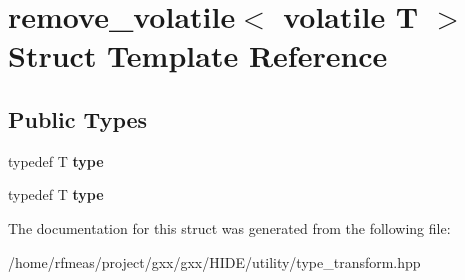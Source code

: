 \hypertarget{structremove__volatile_3_01volatile_01T_01_4}{}\section{remove\+\_\+volatile$<$ volatile T $>$ Struct Template Reference}
\label{structremove__volatile_3_01volatile_01T_01_4}
\subsection*{Public Types}
\begin{DoxyCompactItemize}
\item 
typedef T {\bfseries type}\hypertarget{structremove__volatile_3_01volatile_01T_01_4_a013f8cbc86e0a1608502fd45a67b0ecc}{}\label{structremove__volatile_3_01volatile_01T_01_4_a013f8cbc86e0a1608502fd45a67b0ecc}

\item 
typedef T {\bfseries type}\hypertarget{structremove__volatile_3_01volatile_01T_01_4_a013f8cbc86e0a1608502fd45a67b0ecc}{}\label{structremove__volatile_3_01volatile_01T_01_4_a013f8cbc86e0a1608502fd45a67b0ecc}

\end{DoxyCompactItemize}


The documentation for this struct was generated from the following file\+:\begin{DoxyCompactItemize}
\item 
/home/rfmeas/project/gxx/gxx/\+H\+I\+D\+E/utility/type\+\_\+transform.\+hpp\end{DoxyCompactItemize}
